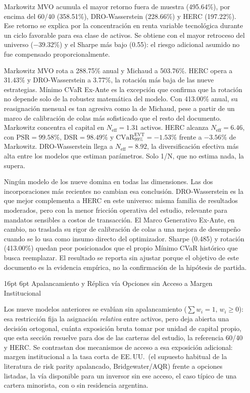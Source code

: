 \documentclass[11pt,a4paper]{article}
\makeatletter
\renewcommand\section{\@startsection{section}{1}{\z@}%
  {16pt \@plus 3pt \@minus 2pt}%
  {6pt}%
  {\centering\large\bfseries\color{navyblue}}}
\makeatother
\begin{document}
Markowitz MVO acumula el mayor retorno fuera de muestra (495.64\%), por encima del 60/40 (358.51\%), DRO-Wasserstein (228.66\%) y HERC (197.22\%). Ese retorno se explica por la concentración en renta variable tecnológica durante un ciclo favorable para esa clase de activos. Se obtiene con el mayor retroceso del universo ($-39.32\%$) y el Sharpe más bajo (0.55): el riesgo adicional asumido no fue compensado proporcionalmente.

Markowitz MVO rota a 288.75\% anual y Michaud a 503.76\%. HERC opera a 31.43\% y DRO-Wasserstein a 3.77\%, la rotación más baja de las nueve estrategias. Mínimo CVaR Ex-Ante es la excepción que confirma que la rotación no depende solo de la robustez matemática del modelo. Con 413.00\% anual, su reasignación mensual es tan agresiva como la de Michaud, pese a partir de un marco de calibración de colas más sofisticado que el resto del documento. Markowitz concentra el capital en $N_{\text{eff}} = 1.31$ activos. HERC alcanza $N_{\text{eff}} = 6.46$, con $\text{PSR} = 99.58\%$, $\text{DSR} = 98.49\%$ y $\text{CVaR}_{99\%}^{\text{EVT}} = -1.53\%$ frente a $-3.56\%$ de Markowitz. DRO-Wasserstein llega a $N_{\text{eff}} = 8.92$, la diversificación efectiva más alta entre los modelos que estiman parámetros. Solo 1/N, que no estima nada, la supera.

Ningún modelo de los nueve domina en todas las dimensiones. Las dos incorporaciones más recientes no cambian esa conclusión. DRO-Wasserstein es la que mejor complementa a HERC en este universo: misma familia de resultados moderados, pero con la menor fricción operativa del estudio, relevante para mandatos sensibles a costos de transacción. El Marco Generativo Ex-Ante, en cambio, no traslada su rigor de calibración de colas a una mejora de desempeño cuando se lo usa como insumo directo del optimizador. Sharpe (0.485) y rotación (413.00\%) quedan peor posicionados que el propio Mínimo CVaR histórico que busca reemplazar. El resultado se reporta sin ajustar porque el objetivo de este documento es la evidencia empírica, no la confirmación de la hipótesis de partida.

\section{Apalancamiento y Réplica vía Opciones sin Acceso a Margen Institucional}
\label{sec:argentina}

Los nueve modelos anteriores se evalúan sin apalancamiento ($\sum w_i = 1$, $w_i \ge 0$): esa restricción fija la asignación \textit{relativa} entre activos, pero deja abierta una decisión ortogonal, cuánta exposición bruta tomar por unidad de capital propio, que esta sección resuelve para dos de las carteras del estudio, la referencia 60/40 y HERC. Se contrastan dos mecanismos de acceso a esa exposición adicional: margen institucional a la tasa corta de EE.\,UU.\ (el supuesto habitual de la literatura de risk parity apalancado, Bridgewater/AQR) frente a opciones listadas, la vía disponible para un inversor sin ese acceso, el caso típico de una cartera minorista, con o sin residencia argentina.
\end{document}
